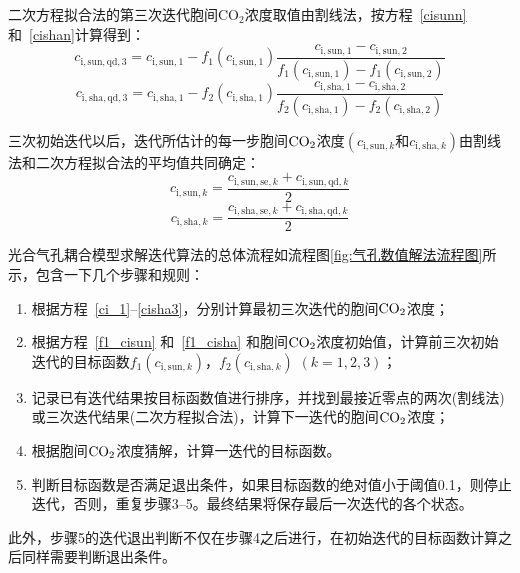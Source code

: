 二次方程拟合法的第三次迭代胞间$\mathrm {CO_2}$浓度取值由割线法，按方程~\eqref{cisunn} 和~\eqref{cishan}计算得到：
%
\begin{equation}\label{cisun3}
c_{\mathrm{i,sun,qd,3}}=c_{\mathrm{i,sun,1}}-f_{1}\left(c_{\mathrm{i,sun,1}}\right)\frac{c_{\mathrm{i,sun,1}}-c_{\mathrm{i,sun,2}}}{ f_{1}\left(c_{\mathrm{i,sun,1}}\right)-f_{1}\left(c_{\mathrm{i,sun,2}}\right)}
\end{equation}
\begin{equation}\label{cisha3}
c_{\mathrm{i,sha,qd,3}}=c_{\mathrm{i,sha,1}}-f_{2}\left(c_{\mathrm{i,sha,1}}\right)\frac{c_{\mathrm{i,sha,1}}-c_{\mathrm{i,sha,2}}}{ f_{2}\left(c_{\mathrm{i,sha,1}}\right)-f_{2}\left(c_{\mathrm{i,sha,2}}\right)}
\end{equation}

三次初始迭代以后，迭代所估计的每一步胞间$\rm CO_2$浓度$\left(c_{\mathrm{i,sun},k}和c_{\mathrm{i,sha},k}\right)$由割线法和二次方程拟合法的平均值共同确定：
\begin{equation}
c_{\mathrm{i,sun},k}=\frac{c_{\mathrm{i,sun,se},k}+c_{\mathrm{i,sun,qd},k}}{2}
\end{equation}
\begin{equation}
c_{\mathrm{i,sha},k}=\frac{c_{\mathrm{i,sha,se},k}+c_{\mathrm{i,sha,qd},k}}{2}
\end{equation}

光合气孔耦合模型求解迭代算法的总体流程如流程图\ref{fig:气孔数值解法流程图}所示，包含一下几个步骤和规则：
\begin{enumerate}
\item
根据方程~\eqref{ci_1}--\eqref{cisha3}，分别计算最初三次迭代的胞间$\rm CO_2$浓度；
\item
根据方程~\eqref{f1_cisun} 和~\eqref{f1_cisha} 和胞间$\rm CO_2$浓度初始值，计算前三次初始迭代的目标函数$f_1\left(c_{\mathrm{i,sun},k}\right)$，$f_2\left(c_{\mathrm{i,sha},k}\right)$ $\left(k=1,2,3\right)$；
\item
记录已有迭代结果按目标函数值进行排序，并找到最接近零点的两次(割线法)或三次迭代结果(二次方程拟合法)，计算下一迭代的胞间$\rm CO_2$浓度；
\item
根据胞间$\rm CO_2$浓度猜解，计算一迭代的目标函数。
\item
判断目标函数是否满足退出条件，如果目标函数的绝对值小于阈值0.1，则停止迭代，否则，重复步骤3--5。最终结果将保存最后一次迭代的各个状态。
\end{enumerate}
此外，步骤5的迭代退出判断不仅在步骤4之后进行，在初始迭代的目标函数计算之后同样需要判断退出条件。

